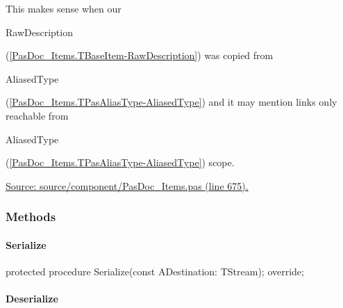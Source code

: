 \documentclass{report}
\newif\ifpdf
\begin{document}
\begin{list}{}
 This makes sense when our \begin{ttfamily}RawDescription\end{ttfamily}(\ref{PasDoc_Items.TBaseItem-RawDescription}) was copied from \begin{ttfamily}AliasedType\end{ttfamily}(\ref{PasDoc_Items.TPasAliasType-AliasedType}) and it may mention links only reachable from \begin{ttfamily}AliasedType\end{ttfamily}(\ref{PasDoc_Items.TPasAliasType-AliasedType}) scope.\par
\href{https://github.com/pasdoc/pasdoc/blob/master/source/component/PasDoc_Items.pas#L675}{Source: source/component/PasDoc{\_}Items.pas (line 675).}\end{list}
\subsubsection*{\large{\textbf{Methods}}\normalsize\hspace{1ex}\hfill}
\paragraph*{Serialize}\hspace*{\fill}

\label{PasDoc_Items.TPasAliasType-Serialize}
\begin{list}{}{
\setlength{\itemindent}{0cm}
\setlength{\listparindent}{0cm}
\setlength{\leftmargin}{\evensidemargin}
\addtolength{\leftmargin}{\tmplength}
\settowidth{\labelsep}{X}
\addtolength{\leftmargin}{\labelsep}
\setlength{\labelwidth}{\tmplength}
}
\item[\textbf{Declaration}\hfill]
\ifpdf
\begin{flushleft}
\fi
\begin{ttfamily}
protected procedure Serialize(const ADestination: TStream); override;\end{ttfamily}

\ifpdf
\end{flushleft}
\fi

\end{list}
\paragraph*{Deserialize}\hspace*{\fill}
\end{document}
